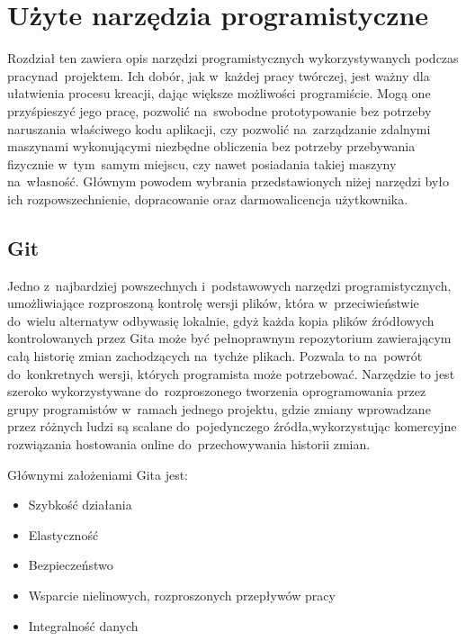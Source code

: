 \chapter{Użyte narzędzia programistyczne}
Rozdział ten zawiera opis narzędzi programistycznych wykorzystywanych podczas pracy\linebreak	 nad~projektem. Ich dobór, jak w~każdej pracy twórczej, jest ważny dla ułatwienia procesu kreacji, dając większe możliwości programiście. Mogą one przyśpieszyć jego pracę, pozwolić na~swobodne prototypowanie bez potrzeby naruszania właściwego kodu aplikacji, czy pozwolić na~zarządzanie zdalnymi maszynami wykonującymi niezbędne obliczenia bez potrzeby przebywania fizycznie w~tym~samym miejscu, czy nawet posiadania takiej maszyny na~własność. Głównym powodem wybrania przedstawionych niżej narzędzi było ich rozpowszechnienie, dopracowanie oraz darmowa\linebreak licencja użytkownika.

\section{Git}
Jedno z~najbardziej powszechnych i~podstawowych narzędzi programistycznych, umożliwiające rozproszoną kontrolę wersji plików, która w~przeciwieństwie do~wielu alternatyw odbywa\linebreak się lokalnie, gdyż każda kopia plików źródłowych kontrolowanych przez Gita może być pełnoprawnym repozytorium zawierającym całą historię zmian zachodzących na~tychże plikach. Pozwala to na~powrót do~konkretnych wersji, których programista może potrzebować. Narzędzie to jest szeroko wykorzystywane do~rozproszonego tworzenia oprogramowania przez grupy programistów w~ramach jednego projektu, gdzie zmiany wprowadzane przez różnych ludzi są scalane do~pojedynczego źródła,\linebreak wykorzystując komercyjne rozwiązania hostowania online do~przechowywania historii zmian.

Głównymi założeniami Gita jest:
\begin{itemize}
	\item Szybkość działania
	\item Elastyczność
	\item Bezpieczeństwo
	\item Wsparcie nielinowych, rozproszonych przepływów pracy
	\item Integralność danych
\end{itemize}

\newpage

